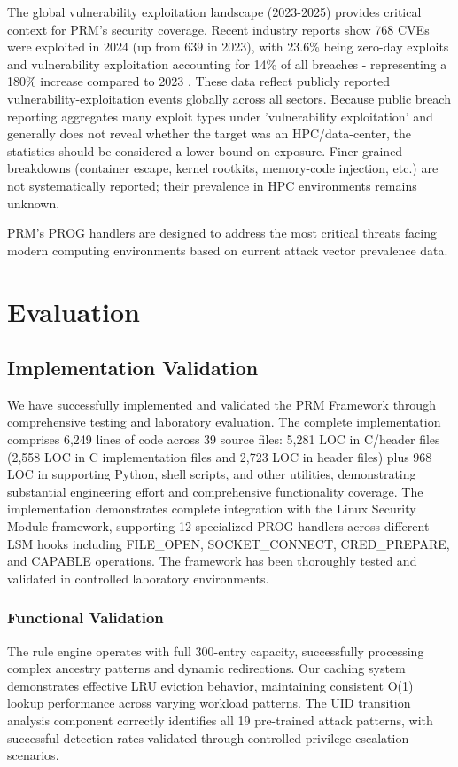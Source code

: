 \documentclass[conference]{IEEEtran}
\begin{document}
The global vulnerability exploitation landscape (2023-2025) provides critical context for PRM's security coverage. Recent industry reports show 768 CVEs were exploited in 2024 (up from 639 in 2023), with 23.6\% being zero-day exploits and vulnerability exploitation accounting for 14\% of all breaches - representing a 180\% increase compared to 2023 \cite{vulncheck2024trends,verizon2024dbir}. These data reflect publicly reported vulnerability-exploitation events globally across all sectors. Because public breach reporting aggregates many exploit types under 'vulnerability exploitation' and generally does not reveal whether the target was an HPC/data-center, the statistics should be considered a lower bound on exposure. Finer-grained breakdowns (container escape, kernel rootkits, memory-code injection, etc.) are not systematically reported; their prevalence in HPC environments remains unknown.

PRM's PROG handlers are designed to address the most critical threats facing modern computing environments based on current attack vector prevalence data.






\section{Evaluation}
\label{sec:evaluation}

\subsection{Implementation Validation}
We have successfully implemented and validated the PRM Framework through comprehensive testing and laboratory evaluation. The complete implementation comprises 6,249 lines of code across 39 source files: 5,281 LOC in C/header files (2,558 LOC in C implementation files and 2,723 LOC in header files) plus 968 LOC in supporting Python, shell scripts, and other utilities, demonstrating substantial engineering effort and comprehensive functionality coverage. The implementation demonstrates complete integration with the Linux Security Module framework, supporting 12 specialized PROG handlers across different LSM hooks including FILE\_OPEN, SOCKET\_CONNECT, CRED\_PREPARE, and CAPABLE operations. The framework has been thoroughly tested and validated in controlled laboratory environments.

\subsubsection{Functional Validation}
The rule engine operates with full 300-entry capacity, successfully processing complex ancestry patterns and dynamic redirections. Our caching system demonstrates effective LRU eviction behavior, maintaining consistent O(1) lookup performance across varying workload patterns. The UID transition analysis component correctly identifies all 19 pre-trained attack patterns, with successful detection rates validated through controlled privilege escalation scenarios.
\end{document}
